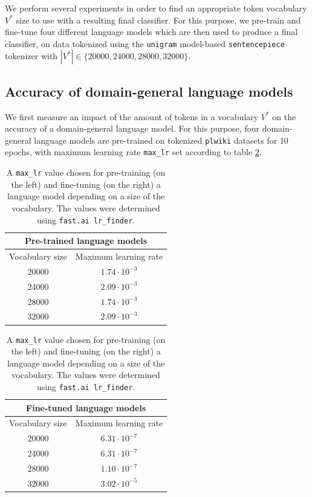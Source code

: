 We perform several experiments in order to find an appropriate token vocabulary $V^*$ size to use with a resulting final classifier. For this purpose, we pre-train and fine-tune four different language models which are then used to produce a final classifier, on data tokenized using the \lstinline{unigram} model-based \lstinline{sentencepiece} tokenizer with $|V^*| \in \{20000, 24000, 28000, 32000\}$.

\subsection{Accuracy of domain-general language models}
\label{vocab:domain-general-results}

We first measure an impact of the amount of tokens in a vocabulary $V^*$ on the accuracy of a domain-general language model. For this purpose, four domain-general language models are pre-trained on tokenized \lstinline{plwiki} datasets for 10 epochs, with maximum learning rate \lstinline{max_lr} set according to table \ref{vocab:generallmlr}.

\begin{table}[ht]
\centering
\begin{tabular}{ cc }
\toprule
\multicolumn{2}{c}{Pre-trained language models} \\ \midrule
Vocabulary size & Maximum learning rate \\ \midrule
20000 & $1.74\cdot10^{-3}$ \\
24000 & $2.09\cdot10^{-3}$ \\
28000 & $1.74\cdot10^{-3}$ \\
32000 & $2.09\cdot10^{-3}$ \\
\bottomrule
\end{tabular}
\quad
\begin{tabular}{ cc }
\toprule
\multicolumn{2}{c}{Fine-tuned language models} \\ \midrule
Vocabulary size & Maximum learning rate \\ \midrule
20000 & $6.31\cdot10^{-7}$ \\
24000 & $6.31\cdot10^{-7}$ \\
28000 & $1.10\cdot10^{-7}$ \\
32000 & $3.02\cdot10^{-5}$ \\
\bottomrule
\end{tabular}
\caption{A \lstinline{max_lr} value chosen for pre-training (on the left) and fine-tuning (on the right) a language model depending on a size of the vocabulary. The values were determined using \lstinline{fast.ai lr_finder}.}
\label{vocab:generallmlr}
\end{table}

